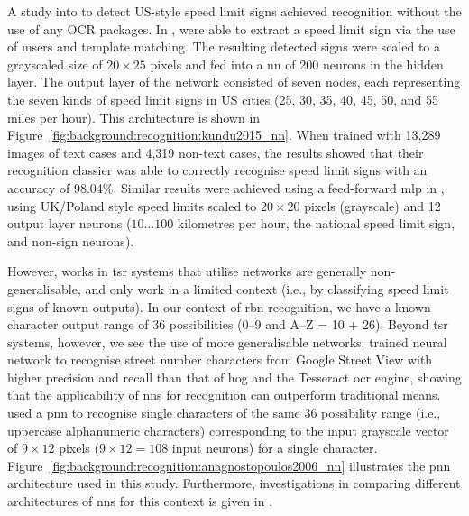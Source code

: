 A \citeyear{Kundu:2015vq} study into  to detect US-style speed limit signs achieved recognition without the use of any OCR packages. In \citep{Kundu:2015vq}, \citeauthor{Kundu:2015vq} were able to extract a speed limit sign via the use of \glspl{mser} and template matching. The resulting detected signs were scaled to a grayscaled size of $20 \times 25$ pixels and fed into a  \gls{nn} of 200 neurons in the hidden layer. The output layer of the network consisted of seven nodes, each representing the seven kinds of speed limit signs in US cities (25, 30, 35, 40, 45, 50, and 55 miles per hour). This architecture is shown in Figure~\ref{fig:background:recognition:kundu2015_nn}. When trained with 13,289 images of text cases and 4,319 non-text cases, the results showed that their recognition classier was able to correctly recognise speed limit signs with an accuracy of 98.04\%. Similar results were achieved using a feed-forward \gls{mlp} in \cite{Eichner:2008dw}, using UK/Poland style speed limits scaled to $20 \times 20$ pixels (grayscale) and 12 output layer neurons ($10 \dots 100$ kilometres per hour, the national speed limit sign, and non-sign neurons).

However, works in \gls{tsr} systems that utilise networks are generally non-generalisable, and only work in a limited context (i.e., by classifying speed limit signs of known outputs). In our context of \gls{rbn} recognition, we have a known character output range of 36 possibilities (0--9 and A--Z = 10 + 26). Beyond \gls{tsr} systems, however, we see the use of more generalisable networks: \citet{Netzer:2011to} trained neural network to recognise street number characters from Google Street View with higher precision and recall than that of \gls{hog} and the Tesseract \gls{ocr} engine, showing that the applicability of \glspl{nn} for recognition can outperform traditional means. \citet{Anagnostopoulos:2006wv} used a \gls{pnn} to recognise single characters of the same 36 possibility range (i.e., uppercase alphanumeric characters) corresponding to the input grayscale vector of $9 \times 12$ pixels ($9 \times 12 = 108$ input neurons) for a single character. Figure~\ref{fig:background:recognition:anagnostopoulos2006_nn} illustrates the \gls{pnn} architecture used in this study. Furthermore, investigations in comparing different architectures of \glspl{nn} for this context is given in \citet{Lee:2016uy}.


